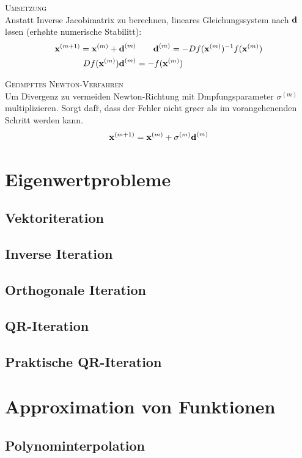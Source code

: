 \textsc{Umsetzung}\\
Anstatt Inverse Jacobimatrix zu berechnen, lineares Gleichungssystem nach $\mbox{\bf d}$ l\o sen (erh\o hte numerische Stabilit\a t):
\begin{align*}
\mbox{\bf x}^{(m+1)} = \mbox{\bf x}^{(m)} + \mbox{\bf d}^{(m)} &\qquad \mbox{\bf d}^{(m)} = -Df(\mbox{\bf x}^{(m)})^{-1}f(\mbox{\bf x}^{(m)})\\
Df(\mbox{\bf x}^{(m)})\mbox{\bf d}^{(m)} &= -f(\mbox{\bf x}^{(m)})
\end{align*}\vspace{0.2cm}

\textsc{Ged\a mpftes Newton-Verfahren}\\
Um Divergenz zu vermeiden Newton-Richtung mit D\a mpfungsparameter $\sigma^{(m)}$ multiplizieren. Sorgt daf\u r, dass der Fehler nicht gr\o \s er als im vorangehenenden Schritt werden kann.
\begin{align*}
\mbox{\bf x}^{(m+1)} = \mbox{\bf x}^{(m)} + \sigma^{(m)}\mbox{\bf d}^{(m)}
\end{align*}

\section{Eigenwertprobleme}
\subsection{Vektoriteration}
\subsection{Inverse Iteration}
\subsection{Orthogonale Iteration}
\subsection{QR-Iteration}
\subsection{Praktische QR-Iteration}

\section{Approximation von Funktionen}
\subsection{Polynominterpolation}
